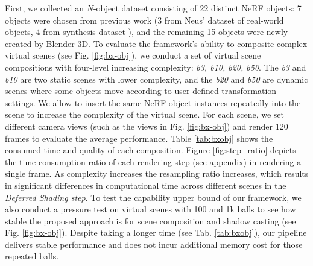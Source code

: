 \documentclass[letterpaper]{article}
\begin{document}
First, we collected an $N$-object dataset consisting of 22 distinct NeRF objects: 7 objects were chosen from previous work (3 from Neus' dataset of real-world objects, 4 from synthesis dataset \cite{mildenhall2020nerf,zhang2022modeling,verbin2022ref}), and the remaining 15 objects were newly created by Blender 3D. To evaluate the framework's ability to composite complex virtual scenes (see Fig. \ref{fig:bx-obj}), we
conduct a set of virtual scene compositions with four-level increasing complexity: \textit{b3, b10, b20, b50}.
The \textit{b3} and \textit{b10} are two static scenes with lower complexity, and the \textit{b20} and \textit{b50} are dynamic scenes where some objects move according to user-defined transformation settings. We allow to insert the same NeRF object instances repeatedly into the scene to increase the complexity of the virtual scene.
For each scene, we set different camera views (such as the views in Fig. \ref{fig:bx-obj}) and render 120 frames to evaluate the average performance. Table \ref{tab:bxobj} shows the consumed time and quality of each composition.
Figure \ref{fig:step_ratio} depicts the time consumption ratio of each rendering step (see appendix) in rendering a single frame. As complexity increases the resampling ratio increases, which results in significant differences in computational time across different scenes in the \textit{Deferred Shading step}.
To test the capability upper bound of our framework, we also conduct a pressure test on virtual scenes with 100 and 1k balls to see how stable the proposed approach is for scene composition and shadow casting (see Fig. \ref{fig:bx-obj}). Despite taking a longer time (see Tab. \ref{tab:bxobj}), our pipeline delivers stable performance and does not incur additional memory cost for those repeated balls.
\end{document}
